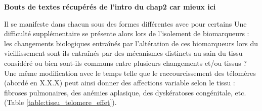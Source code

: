 \textbf{Bouts de textes récupérés de l'intro du chap2 car mieux ici}

Il se manifeste dans chacun sous des formes différentes avec pour certains
Une difficulté supplémentaire se présente alors lors de l'isolement de biomarqueurs : les changements biologiques entraînés par l'altération de ces biomarqueurs lors du vieillissement sont-ils 
entraînés par des mécanismes distincts au sain du tissu considéré ou bien sont-ils communs entre plusieurs changements et/ou tissus ?
Une même modification avec le temps telle que le raccourcissement des télomères (abordé en X.X.X) peut ainsi donner des affections variable selon le tissu : fibroses pulmonaires, des anémies aplasique, des dyskératoses congénitale, etc. \cite{Armanios2012} (Table \ref{table:tissu_telomere_effet}). 

